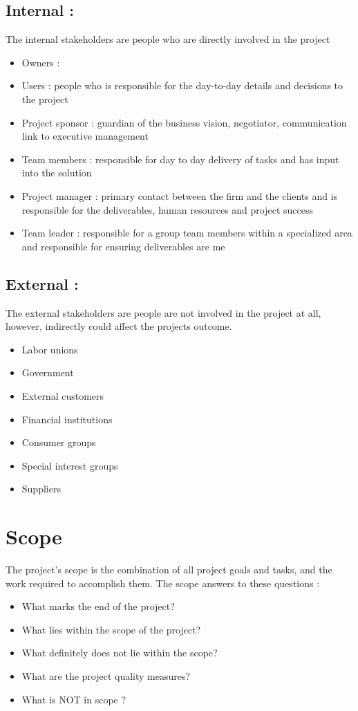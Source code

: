 \documentclass{article}
\begin{document}
\subsection{Internal :}
The internal stakeholders are people who are directly involved in the project
\begin{itemize}
	\item Owners : 
	\item Users : people who is responsible for the day-to-day details and decisions to the project
	\item Project sponsor : guardian of the business vision, negotiator, communication link to executive management
	\item Team members : responsible for day to day delivery of tasks and has input into the solution
	\item Project manager : primary contact between the firm and the clients and is responsible for the deliverables, human resources and project success
	\item Team leader : responsible for a group team members within a specialized area and responsible for ensuring deliverables are me
\end{itemize}

\subsection{External :}
The external stakeholders are people are not involved in the project at all, however, indirectly could affect the projects outcome.
\begin{itemize}
	\item Labor unions
	\item Government
	\item External customers
	\item Financial institutions
	\item Consumer groups
	\item Special interest groups
	\item Suppliers
\end{itemize}


\newpage
\section{Scope}
The project's scope is the combination of all project goals and tasks, and the work required to accomplish them. The scope answers to these questions :
\begin{itemize}
	\item What marks the end of the project? 
	\item What lies within the scope of the project?
	\item What definitely does not lie within the scope?
	\item What are the project quality measures? 
	\item What is NOT in scope ?
\end{itemize}
\end{document}
